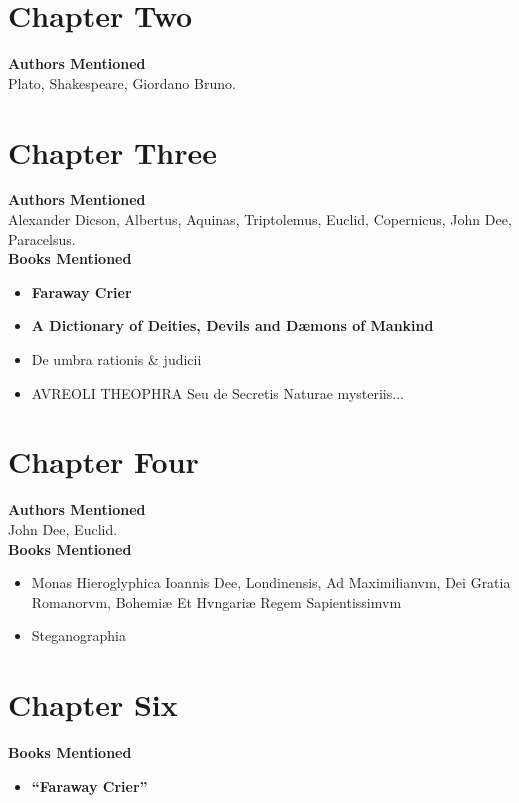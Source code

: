 \documentclass[twoside,10pt]{report}
\begin{document}
\section{Chapter Two}
\textbf{Authors Mentioned}\\
Plato, Shakespeare, Giordano Bruno.

\section{Chapter Three}
\textbf{Authors Mentioned}\\
Alexander Dicson, Albertus, Aquinas, Triptolemus, Euclid, Copernicus, John Dee, Paracelsus.
\\

\textbf{Books Mentioned}
\begin{itemize}
\item \textbf{Faraway Crier} \cite{faraway}
\item \textbf{A Dictionary of Deities, Devils and Dæmons of Mankind} \cite{St.Phalle}
\item De umbra rationis \& judicii \cite{Dicson1584}
\item AVREOLI THEOPHRA Seu de Secretis Naturae mysteriis... \cite{Paracelsus1582}
\end{itemize}

\section{Chapter Four}
\textbf{Authors Mentioned}\\
John Dee, Euclid.
\\

\textbf{Books Mentioned}
\begin{itemize}
\item Monas Hieroglyphica Ioannis Dee, Londinensis, Ad Maximilianvm, Dei Gratia Romanorvm, Bohemiæ Et Hvngariæ Regem Sapientissimvm \cite{Dee1564}
\item Steganographia \cite{Trithemius1608}
\end{itemize}

\section{Chapter Six}
\textbf{Books Mentioned}
\begin{itemize}
\item \textbf{``Faraway Crier''} \cite{faraway}
\end{itemize}
\end{document}
